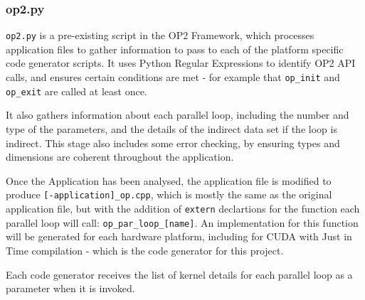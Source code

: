 \subsubsection{op2.py}
\verb|op2.py| is a pre-existing script in the OP2 Framework, which processes application files to gather information to pass to each of the platform specific code generator scripts. It uses Python Regular Expressions to identify OP2 API calls, and ensures certain conditions are met - for example that \verb|op_init| and \verb|op_exit| are called at least once.
\par
It also gathers information about each parallel loop, including the number and type of the parameters, and the details of the indirect data set if the loop is indirect. This stage also includes some error checking, by ensuring types and dimensions are coherent throughout the application.
\par
Once the Application has been analysed, the application file is modified to produce \verb|[-application]_op.cpp|, which is mostly the same as the original application file, but with the addition of \verb|extern| declartions for the function each parallel loop will call: \verb|op_par_loop_[name]|. An implementation for this function will be generated for each hardware platform, including for CUDA with Just in Time compilation - which is the code generator for this project.
\par
Each code generator receives the list of kernel details for each parallel loop as a parameter when it is invoked.

